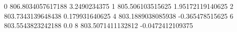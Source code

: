 0 806.8034057617188 3.2490234375
1 805.506103515625 1.95172119140625
2 803.7343139648438 0.179931640625
4 803.1889038085938 -0.365478515625
6 803.5543823242188 0.0
8 803.5071411132812 -0.0472412109375
